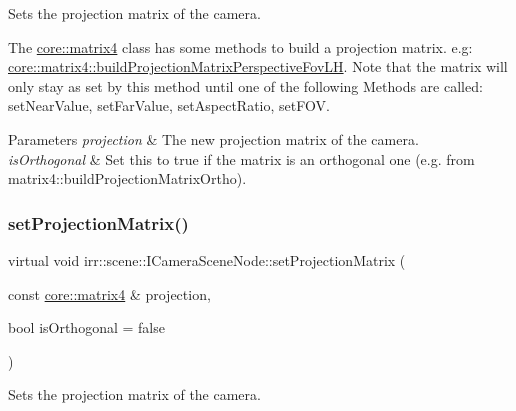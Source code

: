 Sets the projection matrix of the camera. 

The \hyperlink{namespaceirr_1_1core_a4c9d4e29899535971052810954a14431}{core\+::matrix4} class has some methods to build a projection matrix. e.\+g\+: \hyperlink{classirr_1_1core_1_1CMatrix4_a1895b967a8f8c9d7ad90fe5434f2499f}{core\+::matrix4\+::build\+Projection\+Matrix\+Perspective\+Fov\+LH}. Note that the matrix will only stay as set by this method until one of the following Methods are called\+: set\+Near\+Value, set\+Far\+Value, set\+Aspect\+Ratio, set\+F\+OV. 
\begin{DoxyParams}{Parameters}
{\em projection} & The new projection matrix of the camera. \\
\hline
{\em is\+Orthogonal} & Set this to true if the matrix is an orthogonal one (e.\+g. from matrix4\+::build\+Projection\+Matrix\+Ortho). \\
\hline
\end{DoxyParams}
\mbox{\label{classirr_1_1scene_1_1ICameraSceneNode_a022415e06070ad77c6053eba64ba62ae}} 
\subsubsection{\texorpdfstring{set\+Projection\+Matrix()}{setProjectionMatrix()}\hspace{0.1cm}{\footnotesize\ttfamily [2/2]}}
{\footnotesize\ttfamily virtual void irr\+::scene\+::\+I\+Camera\+Scene\+Node\+::set\+Projection\+Matrix (\begin{DoxyParamCaption}\item[{const \hyperlink{namespaceirr_1_1core_a4c9d4e29899535971052810954a14431}{core\+::matrix4} \&}]{projection,  }\item[{bool}]{is\+Orthogonal = {\ttfamily false} }\end{DoxyParamCaption})\hspace{0.3cm}{\ttfamily [pure virtual]}}



Sets the projection matrix of the camera. 


